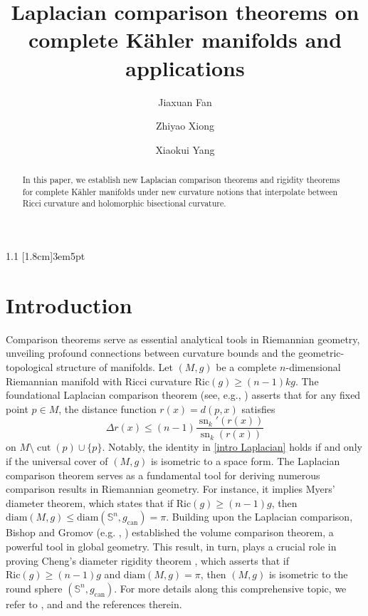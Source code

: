 \documentclass[12pt,reqno]{amsart}
\title{Laplacian comparison theorems on complete K\"ahler manifolds and applications}
\author{Jiaxuan Fan}
\author{Zhiyao Xiong}
\author{Xiaokui Yang}
\theoremstyle{plain}
\theoremstyle{definition}
\renewcommand{\>}{\rightarrow}
\numberwithin{equation}{section} %
\renewcommand{\leq}{\leqslant}
\renewcommand{\geq}{\geqslant}
\begin{document}
\begin{abstract}
In this paper, we establish new Laplacian comparison theorems and rigidity theorems for complete K\"ahler manifolds under new curvature notions that interpolate between Ricci curvature and holomorphic bisectional curvature.
\end{abstract}
\maketitle
    \setcounter{tocdepth}{1}


{\small{    \begin{spacing}{1.1} \tableofcontents %
            [1.8cm]{}{3em}{5pt} %
\end{spacing} }}


\section{Introduction}
Comparison theorems serve as essential analytical tools in Riemannian geometry, unveiling profound connections between curvature bounds and the geometric-topological structure of manifolds.
Let $(M,g)$ be a complete $n$-dimensional Riemannian manifold with Ricci curvature $\mathrm{Ric}(g)\geq (n-1)kg$.
The foundational Laplacian comparison theorem (see, e.g., \cite{Pet16, Lee18}) asserts that for any fixed point $p \in M$, the distance function $r(x) = d(p,x)$ satisfies
\begin{equation}
\Delta r(x)
\leq (n-1)\frac{\operatorname{sn}_k'(r(x))}{\operatorname{sn}_k(r(x))}
\label{intro Laplacian}
\end{equation}
on $M \setminus \operatorname{cut}(p) \cup \{p\}$. Notably, the identity in \eqref{intro Laplacian}  holds if and only if the universal cover of $(M,g)$ is isometric to a space form.
The Laplacian comparison theorem serves as a fundamental tool for deriving numerous comparison results in Riemannian geometry. For instance, it implies Myers' diameter theorem, which states that if $\mathrm{Ric}(g) \geq (n-1)g$, then $\mathrm{diam}(M,g) \leq \mathrm{diam}(\mathbb{S}^n, g_{\mathrm{can}}) = \pi$. Building upon the Laplacian comparison, Bishop and Gromov (e.g. \cite{BC64}, \cite{CE08}) established the volume comparison theorem, a powerful tool in global geometry. This result, in turn, plays a crucial role in proving Cheng's diameter rigidity theorem \cite{Che75}, which asserts that if $\mathrm{Ric}(g) \geq (n-1)g$ and $\mathrm{diam}(M,g) = \pi$, then $(M,g)$ is isometric to the round sphere $(\mathbb{S}^n, g_{\mathrm{can}})$.
For more details along this comprehensive topic, we refer to \cite{CC97},  \cite{Zhu97} and \cite{Wei07} and the references therein.\\
\end{document}
